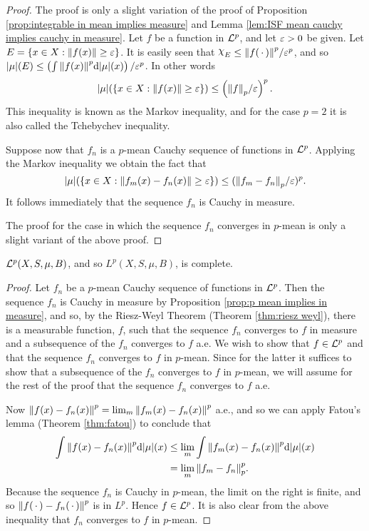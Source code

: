 \begin{proof}
The proof is only a slight variation of the proof of Proposition \ref{prop:integrable in mean implies measure} and Lemma \ref{lem:ISF mean cauchy implies cauchy in measure}. Let $f$ be a function in ${\cal L}^p$, and let $\varepsilon>0$ be given. Let $E=\left\{x\in X:\norm{f(x)}\geq\varepsilon\right\}$. It is easily seen that $\idf{E}\leq\norm{f(\imarg)}^p/\ep^p$, and so $|\mu|(E)\leq\left(\int\norm{f(x)}^p\dd|\mu|(x)\right)/\varepsilon^p$. In other words \[|\mu|(\left\{x\in X:\norm{f(x)}\geq\varepsilon\right\})\leq\left(\norm{f}_p/\varepsilon\right)^p.\]
This inequality is known as the Markov inequality, and for the case $p=2$ it is also called the Tchebychev inequality.

Suppose now that $f_n$ is a $p$-mean Cauchy sequence of functions in ${\cal L}^p$. Applying the Markov inequality we obtain the fact that \[|\mu|(\left\{x\in X:\norm{f_m(x)-f_n(x)}\geq\varepsilon\right\})\leq(\norm{f_m-f_n}_p/\varepsilon)^p.\]
It follows immediately that the sequence $f_n$ is Cauchy in measure.

The proof for the case in which the sequence $f_n$ converges in $p$-mean is only a slight variant of the above proof.
\end{proof}

\begin{theorem}
${\cal L}^p(X,S,\mu,B)$, and so $L^p(X,S,\mu,B)$, is complete.
\end{theorem}

\begin{proof}
Let $f_n$ be a $p$-mean Cauchy sequence of functions in ${\cal L}^p$. Then the sequence $f_n$ is Cauchy in measure by Proposition \ref{prop:p mean implies in measure}, and so, by the Riesz-Weyl Theorem (Theorem \ref{thm:riesz weyl}), there is a measurable function, $f$, such that the sequence $f_n$ converges to $f$ in measure and a subsequence of the $f_n$ converges to $f$ a.e. We wish to show that $f\in{\cal L}^p$ and that the sequence $f_n$ converges to $f$ in $p$-mean. Since for the latter it suffices to show that a subsequence of the $f_n$ converges to $f$ in $p$-mean, we will assume for the rest of the proof that the sequence $f_n$ converges to $f$ a.e.

Now $\norm{f(x)-f_n(x)}^p=\lim_m\norm{f_m(x)-f_n(x)}^p$ a.e., and so we can apply Fatou's lemma (Theorem \ref{thm:fatou}) to conclude that
\begin{align*}
    \int\norm{f(x)-f_n(x)}^p\dd|\mu|(x)&\leq\lim _m\int\norm{f_m(x)-f_n(x)}^p\dd|\mu|(x)\\
    &=\lim_m\norm{f_m-f_n}_p^p.
\end{align*} Because the sequence $f_n$ is Cauchy in $p$-mean, the limit on the right is finite, and so $\norm{f(\,\cdot\,)-f_n(\,\cdot\,)}^p$ is in $L^p$. Hence $f\in{\cal L}^p$. It is also clear from the above inequality that $f_n$ converges to $f$ in $p$-mean.
\end{proof}

